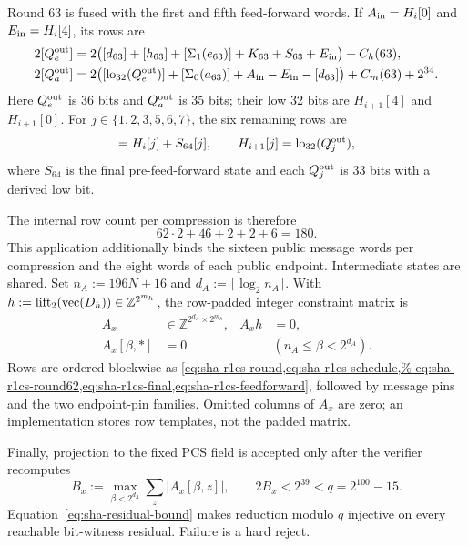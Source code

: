 Round $63$ is fused with the first and fifth feed-forward words.  If
$A_{\rm in}=H_i[0]$ and $E_{\rm in}=H_i[4]$, its rows are
\begin{equation}
 \begin{aligned}
 2[Q^{\rm out}_e]&=2\bigl([d_{63}]+[h_{63}]+[\Sigma_1(e_{63})]+K_{63}
       +S_{63}+E_{\rm in}\bigr)+C_h(63),\\
 2[Q^{\rm out}_a]&=2\bigl([\operatorname{lo}_{32}(Q^{\rm out}_e)]+[\Sigma_0(a_{63})]
       +A_{\rm in}-E_{\rm in}-[d_{63}]\bigr)+C_m(63)+2^{34}.
 \end{aligned}
 \label{eq:sha-r1cs-final}
\end{equation}
Here $Q^{\rm out}_e$ is 36 bits and $Q^{\rm out}_a$ is 35 bits; their low
32 bits are $H_{i+1}[4]$ and $H_{i+1}[0]$.  For
$j\in\{1,2,3,5,6,7\}$, the six remaining rows are
\begin{equation}
 [Q^{\rm out}_j]=H_i[j]+S_{64}[j],\qquad
 H_{i+1}[j]=\operatorname{lo}_{32}(Q^{\rm out}_j),
 \label{eq:sha-r1cs-feedforward}
\end{equation}
where $S_{64}$ is the final pre-feed-forward state and each
$Q^{\rm out}_j$ is 33 bits with a derived low bit.

The internal row count per compression is therefore
\begin{equation}
 62\cdot2+46+2+2+6=180.
 \label{eq:sha-r1cs-census}
\end{equation}
This application additionally binds the sixteen public message words per
compression and the eight words of each public endpoint.  Intermediate states
are shared.  Set $n_A:=196N+16$ and
$d_A:=\lceil\log_2n_A\rceil$.  With
$h:=\operatorname{lift}_{2}(\operatorname{vec}(D_h))\in\mathbb Z^{2^{m_h}}$, the row-padded
integer constraint matrix is
\begin{equation}
 \begin{aligned}
 A_x&\in\mathbb Z^{2^{d_A}\times2^{m_h}},& A_xh&=0,\\
 A_x[\beta,*]&=0&& (n_A\le\beta<2^{d_A}).
 \end{aligned}
 \label{eq:sha-relation-census}
\end{equation}
Rows are ordered blockwise as
\cref{eq:sha-r1cs-round,eq:sha-r1cs-schedule,%
eq:sha-r1cs-round62,eq:sha-r1cs-final,eq:sha-r1cs-feedforward}, followed by
message pins and the two endpoint-pin families.  Omitted columns of $A_x$ are
zero; an implementation stores row templates, not the padded matrix.

Finally, projection to the fixed PCS field is accepted only after the verifier
recomputes
\begin{equation}
 B_x:=\max_{\beta<2^{d_A}}\sum_z|A_x[\beta,z]|,\qquad
 2B_x<2^{39}<q=2^{100}-15.
 \label{eq:sha-residual-bound}
\end{equation}
Equation~\eqref{eq:sha-residual-bound} makes reduction modulo $q$ injective on
every reachable bit-witness residual.  Failure is a hard reject.
